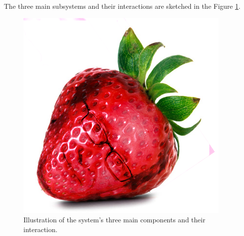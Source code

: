 The three main subsystems and their interactions are sketched in the Figure \ref{fig:ThreeMainSubsystemsSketch}. 

\begin{figure}[h!]
\centering
\includegraphics[width=0.4\linewidth]{Figures/strawberry}
\caption{\label{fig:ThreeMainSubsystemsSketch} Illustration of the system's three main components and their interaction.}

\end{figure}
